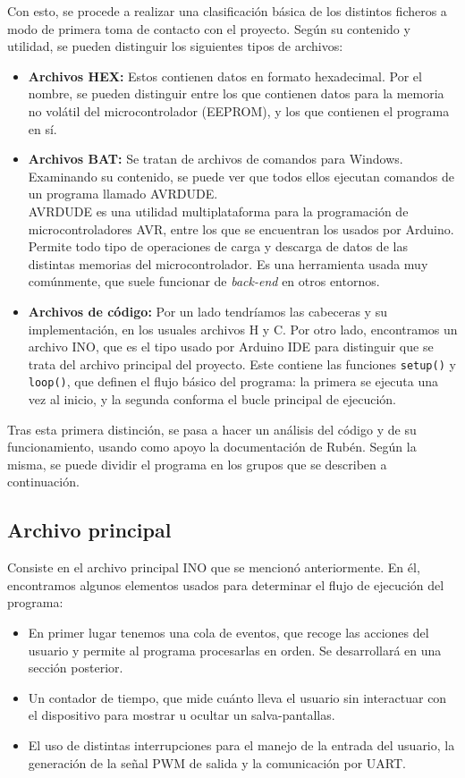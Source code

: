 Con esto, se procede a realizar una clasificación básica de los distintos ficheros a modo de primera toma de contacto con el proyecto. Según su contenido y utilidad, se pueden distinguir los siguientes tipos de archivos:

\begin{itemize}
    \item{\textbf{Archivos HEX:}} Estos contienen datos en formato hexadecimal. Por el nombre, se pueden distinguir entre los que contienen datos para la memoria no volátil del microcontrolador (EEPROM), y los que contienen el programa en sí.
    \item{\textbf{Archivos BAT:}} Se tratan de archivos de comandos para Windows. Examinando su contenido, se puede ver que todos ellos ejecutan comandos de un programa llamado AVRDUDE.\\
    AVRDUDE \cite{avrdude} es una utilidad multiplataforma para la programación de microcontroladores AVR, entre los que se encuentran los usados por Arduino. Permite todo tipo de operaciones de carga y descarga de datos de las distintas memorias del microcontrolador. Es una herramienta usada muy comúnmente, que suele funcionar de \textit{back-end} en otros entornos.
    \item{\textbf{Archivos de código:}} Por un lado tendríamos las cabeceras y su implementación, en los usuales archivos H y C. Por otro lado, encontramos un archivo INO, que es el tipo usado por Arduino IDE para distinguir que se trata del archivo principal del proyecto. Este contiene las funciones \verb|setup()| y \verb|loop()|, que definen el flujo básico del programa: la primera se ejecuta una vez al inicio, y la segunda conforma el bucle principal de ejecución.
\end{itemize}

Tras esta primera distinción, se pasa a hacer un análisis del código y de su funcionamiento, usando como apoyo la documentación de Rubén. Según la misma, se puede dividir el programa en los grupos que se describen a continuación.

\subsection{Archivo principal}

Consiste en el archivo principal INO que se mencionó anteriormente. En él, encontramos algunos elementos usados para determinar el flujo de ejecución del programa:

\begin{itemize}
    \item En primer lugar tenemos una cola de eventos, que recoge las acciones del usuario y permite al programa procesarlas en orden. Se desarrollará en una sección posterior.
    \item Un contador de tiempo, que mide cuánto lleva el usuario sin interactuar con el dispositivo para mostrar u ocultar un salva-pantallas.
    \item El uso de distintas interrupciones para el manejo de la entrada del usuario, la generación de la señal PWM de salida y la comunicación por UART. \end{itemize}

